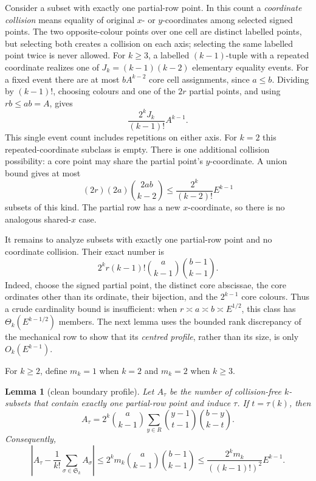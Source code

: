 \documentclass[11pt,letterpaper]{article}
\newtheorem{lemma}[theorem]{Lemma}
\newcommand{\Ssym}{\mathfrak S}
\begin{document}
Consider a subset with exactly one partial-row point.  In this count a
\emph{coordinate collision} means equality of original $x$- or $y$-coordinates
among selected signed points.  The two opposite-colour points over one cell are
distinct labelled points, but selecting both creates a collision on each axis;
selecting the same labelled point twice is never allowed.  For $k\geq3$, a
labelled $(k-1)$-tuple with a repeated coordinate realizes one of
$J_k=(k-1)(k-2)$ elementary equality events.  For a fixed event there
are at most $bA^{k-2}$ core cell assignments, since $a\leq b$.
Dividing by $(k-1)!$, choosing colours and one of the $2r$ partial
points, and using $rb\leq ab=A$, gives
\[
 \frac{2^kJ_k}{(k-1)!}A^{k-1}.
\]
This single event count includes repetitions on either axis.  For $k=2$
this repeated-coordinate subclass is empty.
There is one additional collision possibility: a core point may share
the partial point's $y$-coordinate.  A union bound gives at most
\begin{equation}\label{eq:shared-y}
 (2r)(2a)\binom{2ab}{k-2}
 \leq\frac{2^k}{(k-2)!}E^{k-1}
\end{equation}
subsets of this kind.  The partial row has a new $x$-coordinate, so
there is no analogous shared-$x$ case.

It remains to analyze subsets with exactly one partial-row point and no
coordinate collision.  Their exact number is
\[
 2^k r (k-1)!\binom a{k-1}\binom{b-1}{k-1}.
\]
Indeed, choose the signed partial point, the distinct core abscissae, the
core ordinates other than its ordinate, their bijection, and the $2^{k-1}$
core colours.  Thus a crude cardinality bound is insufficient: when
$r\asymp a\asymp b\asymp E^{1/2}$, this class has
$\Theta_k(E^{k-1/2})$ members.  The next lemma uses the bounded rank
discrepancy of the mechanical row to show that its \emph{centred profile},
rather than its size, is only $O_k(E^{k-1})$.

For $k\geq2$, define $m_k=1$ when $k=2$ and $m_k=2$ when $k\geq3$.

\begin{lemma}[clean boundary profile]\label{lem:boundary-profile}
Let $A_\tau$ be the number of collision-free $k$-subsets that contain
exactly one partial-row point and induce $\tau$.  If
$t=\tau(k)$, then
\begin{equation}\label{eq:A-tau}
 A_\tau
 =2^k\binom{a}{k-1}
   \sum_{y\in R}
     \binom{y-1}{t-1}\binom{b-y}{k-t}.
\end{equation}
Consequently,
\begin{equation}\label{eq:boundary-explicit}
 \left|A_\tau-\frac1{k!}\sum_{\sigma\in\Ssym_k}A_\sigma\right|
 \leq2^km_k\binom{a}{k-1}\binom{b-1}{k-1}
 \leq\frac{2^km_k}{((k-1)!)^2}E^{k-1}.
\end{equation}
\end{lemma}
\end{document}
